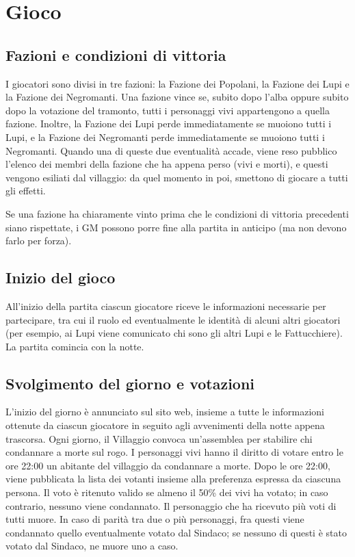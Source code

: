 \documentclass[a4paper,10pt]{article}
\begin{document}
\pagebreak
\section{Gioco}

\subsection{Fazioni e condizioni di vittoria}

I giocatori sono divisi in tre fazioni: la Fazione dei Popolani, la Fazione dei Lupi e la Fazione dei Negromanti. Una fazione vince se, subito dopo l'alba oppure subito dopo la votazione del tramonto, tutti i personaggi vivi appartengono a quella fazione. Inoltre, la Fazione dei Lupi perde immediatamente se muoiono tutti i Lupi, e la Fazione dei Negromanti perde immediatamente se muoiono tutti i Negromanti. Quando una di queste due eventualità accade, viene reso pubblico l'elenco dei membri della fazione che ha appena perso (vivi e morti), e questi vengono esiliati dal villaggio: da quel momento in poi, smettono di giocare a tutti gli effetti.

Se una fazione ha chiaramente vinto prima che le condizioni di vittoria precedenti siano rispettate, i GM possono porre fine alla partita in anticipo (ma non devono farlo per forza).

\subsection{Inizio del gioco}

All'inizio della partita ciascun giocatore riceve le informazioni necessarie per partecipare, tra cui il ruolo ed eventualmente le identità di alcuni altri giocatori (per esempio, ai Lupi viene comunicato chi sono gli altri Lupi e le Fattucchiere). La partita comincia con la notte.

\subsection{Svolgimento del giorno e votazioni}

L'inizio del giorno è annunciato sul sito web, insieme a tutte le informazioni ottenute da ciascun giocatore in seguito agli avvenimenti della notte appena trascorsa. Ogni giorno, il Villaggio convoca un'assemblea per stabilire chi condannare a morte sul rogo. I personaggi vivi hanno il diritto di votare entro le ore 22:00 un abitante del villaggio da condannare a morte. Dopo le ore 22:00, viene pubblicata la lista dei votanti insieme alla preferenza espressa da ciascuna persona.
Il voto è ritenuto valido se almeno il 50\% dei vivi ha votato; in caso contrario, nessuno viene condannato. Il personaggio che ha ricevuto più voti di tutti muore.
In caso di parità tra due o più personaggi, fra questi viene condannato quello eventualmente votato dal Sindaco; se nessuno di questi è stato votato dal Sindaco, ne muore uno a caso.
\end{document}
